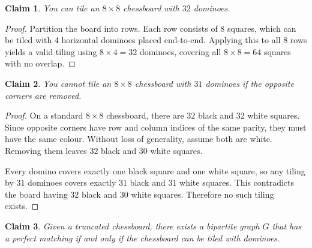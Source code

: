 \documentclass{article}
\newtheorem{claim}{Claim}
\begin{document}
\begin{claim}
    You can tile an $8 \times 8$ chessboard with $32$ dominoes.
\end{claim}

\begin{proof}
    Partition the board into rows. Each row consists of $8$ squares,
    which can be tiled with $4$ horizontal dominoes placed end-to-end.
    Applying this to all $8$ rows yields a valid tiling using 
    $8 \times 4 = 32$ dominoes, covering all $8 \times 8 = 64$ squares
    with no overlap.
\end{proof}

\begin{claim}
    You cannot tile an $8 \times 8$ chessboard with $31$ dominoes
    if the opposite corners are removed.
\end{claim}

\begin{proof}
    On a standard $8 \times 8$ chessboard, there are $32$ black and $32$ white 
    squares. Since opposite corners have row and column indices of the same 
    parity, they must have the same colour. Without loss of generality, assume 
    both are white. Removing them leaves $32$ black and $30$ white squares.

    \medskip
    
    Every domino covers exactly one black square and one white square,
    so any tiling by $31$ dominoes covers exactly $31$ black and $31$ white squares. 
    This contradicts the board having $32$ black and $30$ white squares. 
    Therefore no such tiling exists.
\end{proof}

\begin{claim}
    Given a truncated chessboard, there exists a bipartite graph $G$
    that has a perfect matching if and only if the chessboard can be
    tiled with dominoes.
\end{claim}
\end{document}
